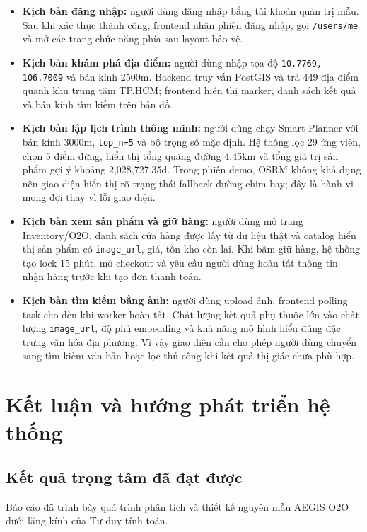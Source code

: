 \documentclass[12pt, a4paper]{article}
\begin{document}
\begin{itemize}
    \item \textbf{Kịch bản đăng nhập:} người dùng đăng nhập bằng tài khoản quản trị mẫu. Sau khi xác thực thành công, frontend nhận phiên đăng nhập, gọi \texttt{/users/me} và mở các trang chức năng phía sau layout bảo vệ.

    \item \textbf{Kịch bản khám phá địa điểm:} người dùng nhập tọa độ \texttt{10.7769, 106.7009} và bán kính 2500m. Backend truy vấn PostGIS và trả 449 địa điểm quanh khu trung tâm TP.HCM; frontend hiển thị marker, danh sách kết quả và bán kính tìm kiếm trên bản đồ.

    \item \textbf{Kịch bản lập lịch trình thông minh:} người dùng chạy Smart Planner với bán kính 3000m, \texttt{top\_n=5} và bộ trọng số mặc định. Hệ thống lọc 29 ứng viên, chọn 5 điểm dừng, hiển thị tổng quãng đường 4.45km và tổng giá trị sản phẩm gợi ý khoảng 2,028,727.35đ. Trong phiên demo, OSRM không khả dụng nên giao diện hiển thị rõ trạng thái fallback đường chim bay; đây là hành vi mong đợi thay vì lỗi giao diện.
    
    \item \textbf{Kịch bản xem sản phẩm và giữ hàng:} người dùng mở trang Inventory/O2O, danh sách cửa hàng được lấy từ dữ liệu thật và catalog hiển thị sản phẩm có \texttt{image\_url}, giá, tồn kho còn lại. Khi bấm giữ hàng, hệ thống tạo lock 15 phút, mở checkout và yêu cầu người dùng hoàn tất thông tin nhận hàng trước khi tạo đơn thanh toán.

    \item \textbf{Kịch bản tìm kiếm bằng ảnh:} người dùng upload ảnh, frontend polling task cho đến khi worker hoàn tất. Chất lượng kết quả phụ thuộc lớn vào chất lượng \texttt{image\_url}, độ phủ embedding và khả năng mô hình hiểu đúng đặc trưng văn hóa địa phương. Vì vậy giao diện cần cho phép người dùng chuyển sang tìm kiếm văn bản hoặc lọc thủ công khi kết quả thị giác chưa phù hợp.
\end{itemize}

\clearpage
\section{Kết luận và hướng phát triển hệ thống}

\subsection{Kết quả trọng tâm đã đạt được}
Báo cáo đã trình bày quá trình phân tích và thiết kế nguyên mẫu AEGIS O2O dưới lăng kính của Tư duy tính toán.
\end{document}
